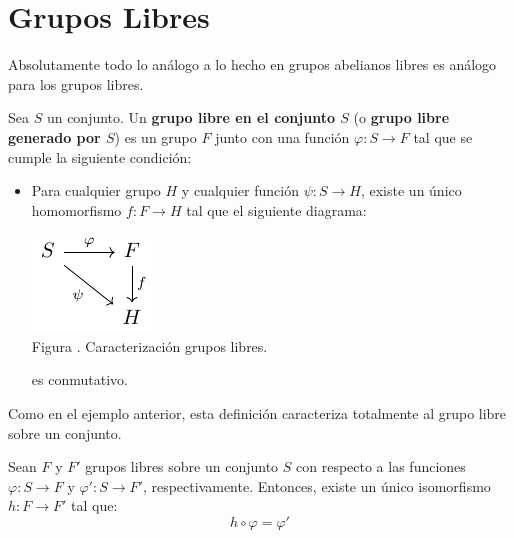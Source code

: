\documentclass[12pt]{report}
\theoremstyle{largebreak}
\newcommand\cf[3]{\ensuremath{#1:#2\rightarrow#3}}
\newcounter{figcount}
\begin{document}
    \section{Grupos Libres}

    Absolutamente todo lo análogo a lo hecho en grupos abelianos libres es análogo para los grupos libres.

    \begin{mydef}
        Sea $S$ un conjunto. Un \textbf{grupo libre en el conjunto $S$} (o \textbf{grupo libre generado por $S$}) es un grupo $F$ junto con una función $\cf{\varphi}{S}{F}$ tal que se cumple la siguiente condición:
        \begin{itemize}
            \item Para cualquier grupo $H$ y cualquier función $\cf{\psi}{S}{H}$, existe un único homomorfismo $\cf{f}{F}{H}$ tal que el siguiente diagrama:
            
            \begin{minipage}{\textwidth}
                \begin{center}
                    \includegraphics[scale=1.5]{images/fig_12.pdf}\\
                    Figura \thefigcount. Caracterización grupos libres.
                \end{center}
            \end{minipage}
            
            es conmutativo.
        \end{itemize}
    \end{mydef}

    Como en el ejemplo anterior, esta definición caracteriza totalmente al grupo libre sobre un conjunto.

    \begin{propo}
        Sean $F$ y $F'$ grupos libres sobre un conjunto $S$ con respecto a las funciones $\cf{\varphi}{S}{F}$ y $\cf{\varphi'}{S}{F'}$, respectivamente. Entonces, existe un único isomorfismo $\cf{h}{F}{F'}$ tal que:
        \begin{equation*}
            h\circ\varphi=\varphi'
        \end{equation*}
    \end{propo}
\end{document}
